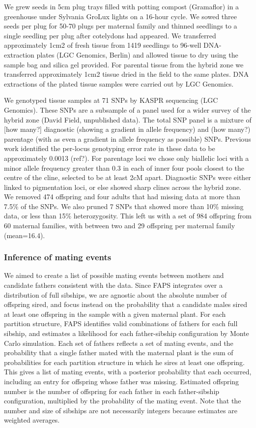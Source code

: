 \documentclass[10pt, a4paper, twocolumn]{article} %
\begin{document}
We grew seeds in 5cm plug trays filled with potting compost (Gramaflor) in a greenhouse under Sylvania GroLux lights on a 16-hour cycle. We sowed three seeds per plug for 50-70 plugs per maternal family and thinned seedlings to a single seedling per plug after cotelydons had appeared. We transferred approximately 1cm2 of fresh tissue from 1419 seedlings to 96-well DNA-extraction plates (LGC Genomics, Berlin) and allowed tissue to dry using the sample bag and silica gel provided. For parental tissue from the hybrid zone we transferred approximately 1cm2 tissue dried in the field to the same plates. DNA extractions of the plated tissue samples were carried out by LGC Genomics.

We genotyped tissue samples at 71 SNPs by KASPR sequencing (LGC Genomics). These SNPs are a subsample of a panel used for a wider survey of the hybrid zone (David Field, unpublished data). The total SNP panel is a mixture of [how many?] diagnostic (showing a gradient in allele frequency) and (how many?) parentage (with as even a gradient in allele frequency as possible) SNPs. Previous work identified the per-locus genotyping error rate  in these data to be approximately 0.0013 (ref?). For parentage loci we chose only biallelic loci with a minor allele frequency greater than 0.3 in each of inner four pools closest to the centre of the cline, selected to be at least 2cM apart. Diagnostic SNPs were either linked to pigmentation loci, or else showed sharp clines across the hybrid zone. We removed 474 offspring and four adults that had missing data at more than 7.5\% of the SNPs. We also pruned 7 SNPs that showed more than 10\% missing data, or less than 15\% heterozygosity. This left us with a set of 984 offspring from 60 maternal families, with between two and 29 offspring per maternal family (mean=16.4).

\subsubsection{Inference of mating events}

We aimed to create a list of possible mating events between mothers and candidate fathers consistent with the data. Since FAPS integrates over a distribution of full sibships, we are agnostic about the absolute number of offspring sired, and focus instead on the probability that a candidate males sired at least one offspring in the sample with a given maternal plant. For each partition structure, FAPS identifies valid combinations of fathers for each full sibship, and estimates a likelihood for each father-sibship configuration by Monte Carlo simulation. Each set of fathers reflects a set of mating events, and the probability that a single father mated with the maternal plant is the sum of probabilities for each partition structure in which he sires at least one offspring. This gives a list of mating events, with a posterior probability that each occurred, including an entry for offspring whose father was missing. Estimated offspring number is the number of offspring for each father in each father-sibship configuration, multiplied by the probability of the mating event. Note that the number and size of sibships are not necessarily integers because estimates are weighted averages.
\end{document}
